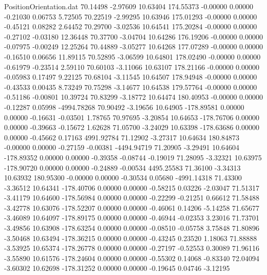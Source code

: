 \begin{filecontents}{PositionOrientation.dat}
  70.14498   -2.97609   10.63404   174.55373   -0.00000    0.00000   -0.21030    0.06753    5.72505
  70.22519   -2.99295   10.63946   175.01293   -0.00000    0.00000   -0.45121    0.08282    2.64452
  70.29700   -3.02536   10.64541   175.20284   -0.00000    0.00000   -0.27102   -0.03180   12.36448
  70.37700   -3.04704   10.64286   176.19206   -0.00000    0.00000   -0.07975   -0.00249   12.25264
  70.44889   -3.05277   10.64268   177.07289   -0.00000    0.00000   -0.16510    0.06656   11.89115
  70.52895   -3.06599   10.64801   178.02490   -0.00000    0.00000   -0.61979   -0.23514    2.59110
  70.60103   -3.11066   10.63107   178.21166   -0.00000    0.00000   -0.05983    0.17497    9.22125
  70.68104   -3.11545   10.64507   178.94948   -0.00000    0.00000   -0.43533    0.00435    8.73249
  70.75298   -3.14677   10.64538   179.57764   -0.00000    0.00000   -0.51186   -0.00801   10.39724
  70.83299   -3.18772   10.64474   180.40953   -0.00000    0.00000   -0.12287    0.05998 -4994.78268
  70.90492   -3.19656   10.64905  -178.89581    0.00000    0.00000   -0.16631   -0.03501    1.78765
  70.97695   -3.20854   10.64653  -178.76706    0.00000    0.00000   -0.39663   -0.15672    1.62628
  71.05700   -3.24029   10.63398  -178.63686    0.00000    0.00000   -0.45662    0.17163 4991.92784
  71.12902   -3.27317   10.64634   180.84873   -0.00000    0.00000   -0.27159   -0.00381 -4494.94719
  71.20905   -3.29491   10.64604  -178.89352    0.00000    0.00000   -0.39358   -0.08744   -0.19019
  71.28095   -3.32321   10.63975  -178.90720    0.00000    0.00000   -0.24889   -0.00534 4495.25583
  71.36100   -3.34313   10.63932   180.95300   -0.00000    0.00000   -0.30534    0.05680 -4991.14318
  71.43300   -3.36512   10.64341  -178.40706    0.00000    0.00000   -0.58215    0.03226   -2.03047
  71.51317   -3.41179   10.64600  -178.56984    0.00000    0.00000   -0.22299   -0.21251    0.66612
  71.58488   -3.42778   10.63076  -178.52207    0.00000    0.00000   -0.46061    0.14206   -5.14258
  71.65677   -3.46089   10.64097  -178.89175    0.00000    0.00000   -0.46944   -0.02353    3.23016
  71.73701   -3.49856   10.63908  -178.63254    0.00000    0.00000   -0.08510   -0.05758    3.75848
  71.80896   -3.50468   10.63494  -178.36215    0.00000    0.00000   -0.43245    0.23520    1.18063
  71.88888   -3.53925   10.65374  -178.26778    0.00000    0.00000   -0.27197   -0.52553    0.30089
  71.96116   -3.55890   10.61576  -178.24604    0.00000    0.00000   -0.55302    0.14068   -0.83340
  72.04094   -3.60302   10.62698  -178.31252    0.00000    0.00000   -0.19645    0.04746   -3.12195

\end{filecontents}
